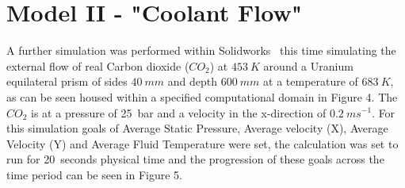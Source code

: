 \documentclass[a4paper,11pt,onecolumn]{article}
\begin{document}
\section{Model II - "Coolant Flow"}

A further simulation was performed within Solidworks\textregistered~ this time
simulating the external flow of real Carbon dioxide ($CO_{2}$) at $453~K$
around a Uranium equilateral prism of sides $40~mm$ and depth $600~mm$ at a
temperature of $683~K$, as can be seen housed within a specified computational
domain in Figure 4. The $CO_{2}$ is at a pressure of 25~bar and a
velocity in the x-direction of $0.2~ms^{-1}$. For this simulation goals of
Average Static Pressure, Average velocity (X), Average Velocity (Y) and Average
Fluid Temperature were set, the calculation was set to run for 20~seconds
physical time and the progression of these goals across the time period can be
seen in Figure 5.
\end{document}
